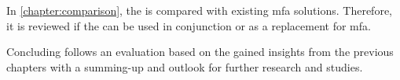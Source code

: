In \autoref{chapter:comparison}, the \wa{} is compared with existing \gls{mfa} solutions. Therefore, it is reviewed if the \wa{} can be used in conjunction or as a replacement for \gls{mfa}.

Concluding follows an evaluation based on the gained insights from the previous chapters with a summing-up and outlook for further research and studies.
